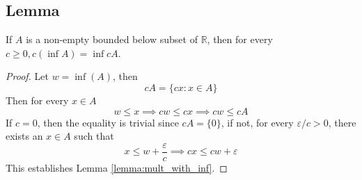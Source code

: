 \documentclass[../../main.tex]{subfiles}
\begin{document}
\subsection{Lemma}
\begin{lemma}\label{lemma:mult_with_inf}
    If $A$ is a non-empty bounded below subset of $\mathbb{R}$, then for every  $c\geq 0, c(\inf A) = \inf cA$.
\end{lemma}
\begin{proof}
    Let $w = \inf(A)$, then 
    \[
    cA = \{cx: x\in A\}
    \]
    Then for every $x\in A$
    \[
    w\leq x\implies cw \leq cx\implies cw\leq cA
    \]
    If $c=0$, then the equality is trivial since $cA = \{0\}$, if not, for every $\varepsilon/c>0$, there exists an $x\in A$ such that
    \[
    x\leq w+\dfrac{\varepsilon}{c}\implies cx\leq cw + \varepsilon
    \]
    This establishes Lemma \ref{lemma:mult_with_inf}.
\end{proof}
\end{document}
